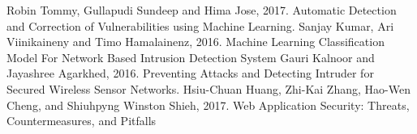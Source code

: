 \begin{thebibliography}{99}

 Robin Tommy, Gullapudi Sundeep and Hima Jose, 2017. Automatic Detection and Correction of Vulnerabilities using Machine Learning.
 Sanjay Kumar, Ari Viinikaineny and Timo Hamalainenz, 2016. Machine Learning Classification Model For Network Based Intrusion Detection System
 Gauri Kalnoor and Jayashree Agarkhed, 2016. Preventing Attacks and Detecting Intruder for Secured Wireless Sensor Networks.
 Hsiu-Chuan Huang, Zhi-Kai Zhang, Hao-Wen Cheng, and Shiuhpyng Winston Shieh, 2017. Web Application Security: Threats, Countermeasures, and Pitfalls


\end{thebibliography}